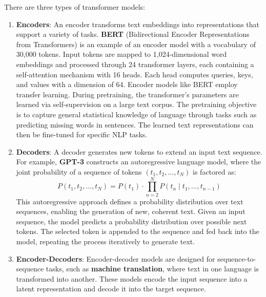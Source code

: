 There are three types of transformer models:
\begin{enumerate}
    \item \textbf{Encoders}: An encoder transforms text embeddings into representations
          that support a variety of tasks. \textbf{BERT} (Bidirectional Encoder
          Representations from Transformers) is an example of an encoder model
          with a vocabulary of 30,000 tokens. Input tokens are mapped to 1,024-dimensional
          word embeddings and processed through 24 transformer layers, each
          containing a self-attention mechanism with 16 heads. Each head computes
          queries, keys, and values with a dimension of 64. Encoder models like
          BERT employ transfer learning. During pretraining, the transformer's
          parameters are learned via self-supervision on a large text corpus. The
          pretraining objective is to capture general statistical knowledge of
          language through tasks such as predicting missing words in sentences.
          The learned text representations can then be fine-tuned for specific
          NLP tasks.
    \item \textbf{Decoders}: A decoder generates new tokens to extend an input
          text sequence. For example, \textbf{GPT-3} constructs an autoregressive
          language model, where the joint probability of a sequence of tokens
          $(t_1, t_2, \dots, t_N)$ is factored as:
          \begin{equation}
              P(t_1, t_2, \dots, t_N) = P(t_1) \cdot \prod_{n=2}^N P(t_n \mid t_1, \dots, t_{n-1})
          \end{equation}
          This autoregressive approach defines a probability distribution over
          text sequences, enabling the generation of new, coherent text. Given an
          input sequence, the model predicts a probability distribution over
          possible next tokens. The selected token is appended to the sequence and
          fed back into the model, repeating the process iteratively to generate
          text.
    \item \textbf{Encoder-Decoders}: Encoder-decoder models are designed for
          sequence-to-sequence tasks, such as \textbf{machine translation}, where
          text in one language is transformed into another. These models encode
          the input sequence into a latent representation and decode it into the
          target sequence.
\end{enumerate}